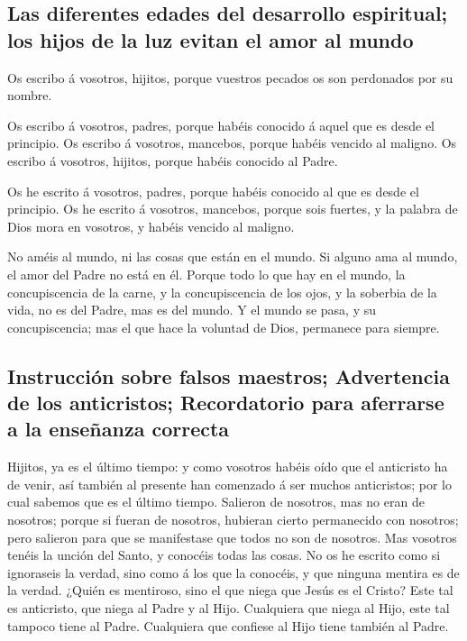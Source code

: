 \hypertarget{las-diferentes-edades-del-desarrollo-espiritual-los-hijos-de-la-luz-evitan-el-amor-al-mundo}{%
\subsection{Las diferentes edades del desarrollo espiritual; los hijos
de la luz evitan el amor al
mundo}\label{las-diferentes-edades-del-desarrollo-espiritual-los-hijos-de-la-luz-evitan-el-amor-al-mundo}}

 Os escribo á vosotros, hijitos, porque vuestros pecados os
son perdonados por su nombre.

 Os escribo á vosotros, padres, porque habéis conocido á
aquel que es desde el principio. Os escribo á vosotros, mancebos, porque
habéis vencido al maligno. Os escribo á vosotros, hijitos, porque habéis
conocido al Padre.

 Os he escrito á vosotros, padres, porque habéis conocido
al que es desde el principio. Os he escrito á vosotros, mancebos, porque
sois fuertes, y la palabra de Dios mora en vosotros, y habéis vencido al
maligno.

 No améis al mundo, ni las cosas que están en el mundo. Si
alguno ama al mundo, el amor del Padre no está en él. 
Porque todo lo que hay en el mundo, la concupiscencia de la carne, y la
concupiscencia de los ojos, y la soberbia de la vida, no es del Padre,
mas es del mundo.  Y el mundo se pasa, y su concupiscencia;
mas el que hace la voluntad de Dios, permanece para siempre.

\hypertarget{instrucciuxf3n-sobre-falsos-maestros-advertencia-de-los-anticristos-recordatorio-para-aferrarse-a-la-enseuxf1anza-correcta}{%
\subsection{Instrucción sobre falsos maestros; Advertencia de los
anticristos; Recordatorio para aferrarse a la enseñanza
correcta}\label{instrucciuxf3n-sobre-falsos-maestros-advertencia-de-los-anticristos-recordatorio-para-aferrarse-a-la-enseuxf1anza-correcta}}

 Hijitos, ya es el último tiempo: y como vosotros habéis
oído que el anticristo ha de venir, así también al presente han
comenzado á ser muchos anticristos; por lo cual sabemos que es el último
tiempo.  Salieron de nosotros, mas no eran de nosotros;
porque si fueran de nosotros, hubieran cierto permanecido con nosotros;
pero salieron para que se manifestase que todos no son de nosotros.
 Mas vosotros tenéis la unción del Santo, y conocéis todas
las cosas.  No os he escrito como si ignoraseis la verdad,
sino como á los que la conocéis, y que ninguna mentira es de la verdad.
 ¿Quién es mentiroso, sino el que niega que Jesús es el
Cristo? Este tal es anticristo, que niega al Padre y al Hijo.
 Cualquiera que niega al Hijo, este tal tampoco tiene al
Padre. Cualquiera que confiese al Hijo tiene también al Padre.

